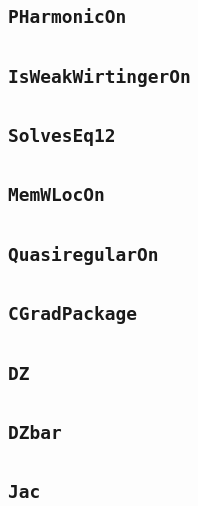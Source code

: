 \documentclass[11pt]{amsart}
\theoremstyle{definition}
\begin{document}
\subsection{\texorpdfstring{\texttt{PHarmonicOn}}{PHarmonicOn}}\label{node:PHarmonicOn}


\subsection{\texorpdfstring{\texttt{IsWeakWirtingerOn}}{IsWeakWirtingerOn}}\label{node:IsWeakWirtingerOn}


\subsection{\texorpdfstring{\texttt{SolvesEq12}}{SolvesEq12}}\label{node:SolvesEq12}


\subsection{\texorpdfstring{\texttt{MemWLocOn}}{MemWLocOn}}\label{node:MemWLocOn}


\subsection{\texorpdfstring{\texttt{QuasiregularOn}}{QuasiregularOn}}\label{node:QuasiregularOn}


\subsection{\texorpdfstring{\texttt{CGradPackage}}{CGradPackage}}\label{node:CGradPackage}


\subsection{\texorpdfstring{\texttt{DZ}}{DZ}}\label{node:DZ}


\subsection{\texorpdfstring{\texttt{DZbar}}{DZbar}}\label{node:DZbar}


\subsection{\texorpdfstring{\texttt{Jac}}{Jac}}\label{node:Jac}

\end{document}
